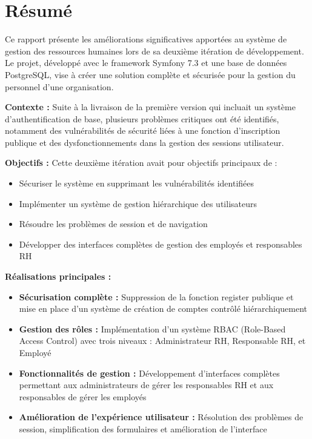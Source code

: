 \documentclass[12pt,a4paper]{article}
\begin{document}
\newpage
\thispagestyle{empty}
\mbox{}

\newpage
\chapter*{Résumé}

Ce rapport présente les améliorations significatives apportées au système de gestion des ressources humaines lors de sa deuxième itération de développement. Le projet, développé avec le framework Symfony 7.3 et une base de données PostgreSQL, vise à créer une solution complète et sécurisée pour la gestion du personnel d'une organisation.

\textbf{Contexte :} Suite à la livraison de la première version qui incluait un système d'authentification de base, plusieurs problèmes critiques ont été identifiés, notamment des vulnérabilités de sécurité liées à une fonction d'inscription publique et des dysfonctionnements dans la gestion des sessions utilisateur.

\textbf{Objectifs :} Cette deuxième itération avait pour objectifs principaux de :
\begin{itemize}
    \item Sécuriser le système en supprimant les vulnérabilités identifiées
    \item Implémenter un système de gestion hiérarchique des utilisateurs
    \item Résoudre les problèmes de session et de navigation
    \item Développer des interfaces complètes de gestion des employés et responsables RH
\end{itemize}

\textbf{Réalisations principales :}
\begin{itemize}
    \item \textbf{Sécurisation complète :} Suppression de la fonction register publique et mise en place d'un système de création de comptes contrôlé hiérarchiquement
    \item \textbf{Gestion des rôles :} Implémentation d'un système RBAC (Role-Based Access Control) avec trois niveaux : Administrateur RH, Responsable RH, et Employé
    \item \textbf{Fonctionnalités de gestion :} Développement d'interfaces complètes permettant aux administrateurs de gérer les responsables RH et aux responsables de gérer les employés
    \item \textbf{Amélioration de l'expérience utilisateur :} Résolution des problèmes de session, simplification des formulaires et amélioration de l'interface
\end{itemize}
\end{document}
